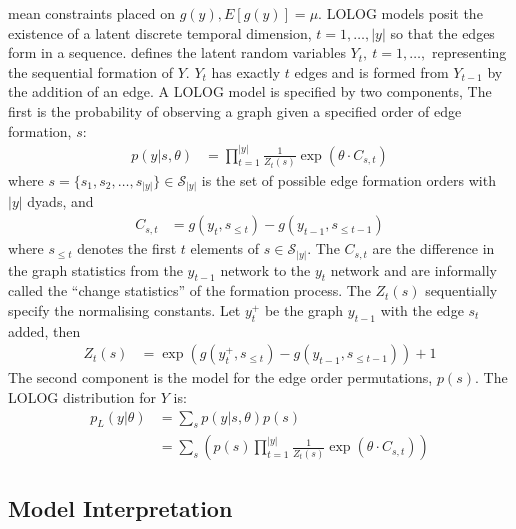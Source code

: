 \documentclass[
]{statsoc}
\begin{document}
mean constraints placed on \(g(y), E[g(y)]=\mu\). LOLOG models posit the
existence of a latent discrete temporal dimension, \(t=1, \ldots, |y|\)
so that the edges form in a sequence. \cite{Fellows2018} defines the
latent random variables \(Y_{t},\ t=1, \ldots,\) representing the
sequential formation of \(Y.\) \(Y_{t}\) has exactly \(t\) edges and is
formed from \(Y_{t-1}\) by the addition of an edge. A LOLOG model is
specified by two components, The first is the probability of observing a
graph given a specified order of edge formation, \(s\): \begin{align}
p(y \vert s,\theta) &= \prod_{t=1}^{|y|} \frac{1}{Z_t(s)} \exp\left(\theta\cdot C_{s,t}\right)
\end{align} \noindent where
\(s=\{s_1, s_2, \ldots, s_{|y|}\} \in \mathscr{S}_{|y|}\) is the set of
possible edge formation orders with \(|y|\) dyads, and \begin{align}
C_{s,t} &= g(y_{t},s_{\leq t}) - g(y_{t-1},s_{\leq t-1})
\end{align} \noindent where \(s_{\leq t}\) denotes the first \(t\)
elements of \(s \in \mathscr{S}_{|y|}\). The \(C_{s,t}\) are the
difference in the graph statistics from the \(y_{t-1}\) network to the
\(y_{t}\) network and are informally called the ``change statistics'' of
the formation process. The \(Z_{t}(s)\) sequentially specify the
normalising constants. Let \(y_{t}^{+}\) be the graph \(y_{t-1}\) with
the edge \(s_{t}\) added, then \begin{align}
Z_{t}(s) &= \exp\left(g(y_{t}^{+},s_{\leq t}) - g(y_{t-1},s_{\leq t-1})\right) + 1
\end{align} The second component is the model for the edge order
permutations, \(p(s)\). The LOLOG distribution for \(Y\) is:
\begin{align}
p_{L}(y \vert \theta) &= \sum_{s} p(y \vert s, \theta)p(s) \nonumber \\
&= \sum_{s} \left( p(s)\prod_{t=1}^{|y|} \frac{1}{Z_t(s)} \exp\left(\theta\cdot C_{s,t}\right)\right) \label{eq:lolog}
\end{align}

\subsection{Model Interpretation}
\end{document}
